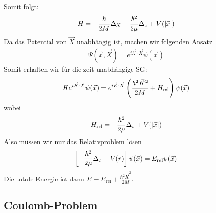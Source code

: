 Somit folgt:
\begin{align*}
    H = - \frac{\hbar}{2 M} \Delta_X - \frac{\hbar^2}{2 \mu} \Delta_x + V(\left\vert \vec{x} \right\vert)
\end{align*}
Da das Potential von $\vec{X}$ unabhängig ist, machen wir folgenden Ansatz
\begin{align*}
    \Psi(\vec{x},\vec{X}) = e^{i \vec{K} \cdot \vec{X}} \psi(\vec{x})
\end{align*}
Somit erhalten wir für die zeit-unabhängige SG:
\begin{align*}
    H e^{i \vec{K} \cdot \vec{X}} \psi(\vec{x}) =
    e^{i \vec{K} \cdot \vec{X}} \left( \frac{\hbar^2 \vec{K}^2}{2 M} + H_{\text{rel}} \right) \psi(\vec{x})
\end{align*}
wobei
\begin{align*}
    H_{\text{rel}} = - \frac{\hbar^2}{2 \mu} \Delta_x + V(\left\vert \vec{x} \right\vert)
\end{align*}
Also müssen wir nur das Relativproblem lösen
\begin{align*}
    \left[ - \frac{\hbar^2}{2 \mu} \Delta_x + V(r) \right] \psi(\vec{x}) = E_{\text{rel}} \psi(\vec{x})
\end{align*}
Die totale Energie ist dann $E = E_{\text{rel}} + \frac{\hbar^2 \vec{K}^2}{2 M}$.


\subsection{Coulomb-Problem}

